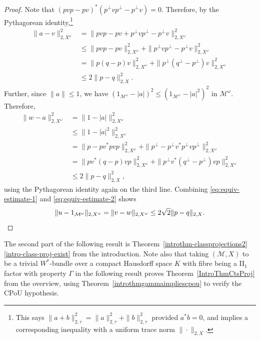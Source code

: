 \documentclass[a4paper,11pt]{amsart}
\theoremstyle{definition}
\numberwithin{equation}{section}
\numberwithin{theorem}{section}
\newcommand{\M}{\mathcal{M}}
\begin{document}
\begin{proof}
	Note that $(pvp - pv)^*(p^\perp v p^\perp - p^\perp v) = 0$.  Therefore, by the Pythagorean identity,\footnote{This says $\|a+b\|_{2,\tau}^2=\|a\|_{2,\tau}^2+\|b\|_{2,\tau}^2$ provided $a^*b=0$, and implies a corresponding inequality with a uniform trace norm $\|\cdot\|_{2,X}$.}
	\begin{equation}\begin{split}\label{eq:equiv-estimate-1}
		\| a - v\|_{2, X^\omega}^2 
        &=\|pvp-pv+p^\perp v p^\perp - p^\perp v\|_{2,X^\omega}^2 \\
		&\leq \|pvp - pv\|_{2, X^\omega}^2 + \|p^\perp v p^\perp - p^\perp v\|_{2, X^\omega}^2  \\
		&= \|p(q - p)v\|_{2, X^\omega}^2 + \|p^\perp(q^\perp - p^\perp)v\|_{2, X^\omega}^2  \\
		&\leq 2 \|p - q\|_{2, X}^2.
	\end{split}\end{equation}
	Further, since $\|a\| \leq 1$, we have $(1_{\M^\omega} - |a|)^2 \leq (1_{\M^\omega} - |a|^2)^2$ in $\M^\omega$.  Therefore,
	\begin{equation}\begin{split}\label{eq:equiv-estimate-2}
		\|w - a\|_{2, X^\omega}^2
		&= \|1 - |a|\|_{2, X^\omega}^2  \\
		&\leq \| 1 - |a|^2 \|_{2, X^\omega}^2  \\
		&= \|p - pv^*pvp\|_{2, X^\omega}^2 + \|p^\perp - p^\perp v^* p^\perp v p^\perp\|_{2, X^\omega}^2  \\
		&= \|pv^*(q - p)vp\|_{2, X^\omega}^2 + \|p^\perp v^*(q^\perp - p^\perp)v p\|_{2, X^\omega}^2  \\
		&\leq 2 \|p - q\|_{2, X}^2,
	\end{split}\end{equation}
    using the Pythagorean identity again on the third line.
	Combining \eqref{eq:equiv-estimate-1} and \eqref{eq:equiv-estimate-2} shows 
	\begin{equation}
		\|u - 1_{\M^\omega}\|_{2, X^\omega} = \|v - w\|_{2, X^\omega} \leq 2 \sqrt{2} \|p-q\|_{2, X}. \qedhere
	\end{equation}
\end{proof}

The second part of the following result is Theorem~\ref{introthm-classprojections2}\ref{intro-class-proj-exist} from the introduction.  Note also that taking $(\mathcal M, X)$ to be a trivial $W^*$-bundle over a compact Hausdorff space $K$ with fibre being a II$_1$ factor with property $\Gamma$ in the following result proves Theorem~\ref{IntroThmCtsProj} from the overview, using Theorem~\ref{introthmgammaimpliescpou} to verify the CPoU hypothesis.
\end{document}
